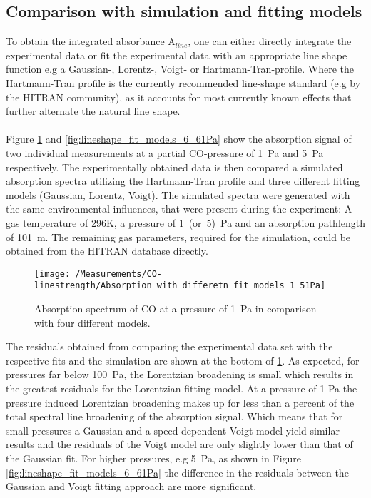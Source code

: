 \subsection{Comparison with simulation and fitting models}
To obtain the integrated absorbance A$_{line}$, one can either directly integrate the experimental data or fit the experimental data with an appropriate line shape function e.g a Gaussian-, Lorentz-, Voigt- or Hartmann-Tran-profile. Where the Hartmann-Tran profile \cite{Hartmann-Tran} is the currently recommended line-shape standard (e.g by the HITRAN community), as it accounts for most currently known effects that further alternate the natural line shape. \\\\
\noindent 
Figure \ref{fig:lineshape_fit_models_1_5Pa} and \ref{fig:lineshape_fit_models_6_61Pa} show the absorption signal of two individual measurements at a partial CO-pressure of \mbox{1 Pa} and \mbox{5 Pa} respectively. The experimentally obtained data is then compared a simulated absorption spectra utilizing the Hartmann-Tran profile and three different fitting models (Gaussian, Lorentz, Voigt). The simulated spectra were generated with the same environmental influences, that were present during the experiment: A gas temperature of 296K, a pressure of \mbox{1 (or 5) Pa} and an absorption pathlength of \mbox{101 m}. The remaining gas parameters, required for the simulation, could be obtained from the HITRAN database directly. 
\begin{figure}[H]
	\centering
	\texttt{[image: /Measurements/CO-linestrength/Absorption\_with\_differetn\_fit\_models\_1\_51Pa]}
	\caption{Absorption spectrum of CO at a pressure of \mbox{1 Pa} in comparison with four different models.}
	\label{fig:lineshape_fit_models_1_5Pa}
\end{figure}
\noindent
The residuals obtained from comparing the experimental data set with the respective fits and the simulation are shown at the bottom of \ref{fig:lineshape_fit_models_1_5Pa}. As expected, for pressures far below \mbox{100 Pa}, the Lorentzian broadening is small which results in the greatest residuals  for the Lorentzian fitting model. At a pressure of 1 Pa the pressure induced Lorentzian broadening makes up for less than a percent of the total spectral line broadening of the absorption signal. Which means that for small pressures a Gaussian and a speed-dependent-Voigt model yield similar results and the residuals of the Voigt model are only slightly lower than that of the Gaussian fit. For higher pressures, e.g \mbox{5 Pa}, as shown in Figure \ref{fig:lineshape_fit_models_6_61Pa} the difference in the residuals between the Gaussian and Voigt fitting approach are more significant.
